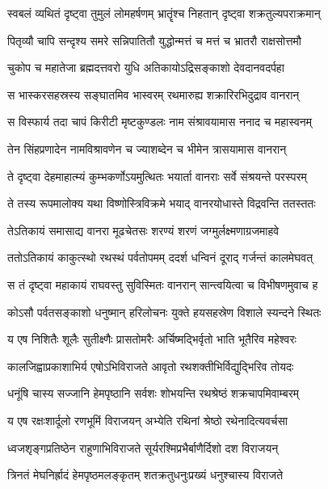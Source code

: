 
\twolineshloka
{स्वबलं व्यथितं दृष्ट्वा तुमुलं लोमहर्षणम्}
{भ्रातॄंश्च निहतान् दृष्ट्वा शक्रतुल्यपराक्रमान्} %

\twolineshloka
{पितृव्यौ चापि सन्दृश्य समरे सन्निपातितौ}
{युद्धोन्मत्तं च मत्तं च भ्रातरौ राक्षसोत्तमौ} %

\twolineshloka
{चुकोप च महातेजा ब्रह्मदत्तवरो युधि}
{अतिकायोऽद्रिसङ्काशो देवदानवदर्पहा} %

\twolineshloka
{स भास्करसहस्रस्य सङ्घातमिव भास्वरम्}
{रथमारुह्य शक्रारिरभिदुद्राव वानरान्} %

\twolineshloka
{स विस्फार्य तदा चापं किरीटी मृष्टकुण्डलः}
{नाम संश्रावयामास ननाद च महास्वनम्} %

\twolineshloka
{तेन सिंहप्रणादेन नामविश्रावणेन च}
{ज्याशब्देन च भीमेन त्रासयामास वानरान्} %

\twolineshloka
{ते दृष्ट्वा देहमाहात्म्यं कुम्भकर्णोऽयमुत्थितः}
{भयार्ता वानराः सर्वे संश्रयन्ते परस्परम्} %

\twolineshloka
{ते तस्य रूपमालोक्य यथा विष्णोस्त्रिविक्रमे}
{भयाद् वानरयोधास्ते विद्रवन्ति ततस्ततः} %

\twolineshloka
{तेऽतिकायं समासाद्य वानरा मूढचेतसः}
{शरण्यं शरणं जग्मुर्लक्ष्मणाग्रजमाहवे} %

\twolineshloka
{ततोऽतिकायं काकुत्स्थो रथस्थं पर्वतोपमम्}
{ददर्श धन्विनं दूराद् गर्जन्तं कालमेघवत्} %

\twolineshloka
{स तं दृष्ट्वा महाकायं राघवस्तु सुविस्मितः}
{वानरान् सान्त्वयित्वा च विभीषणमुवाच ह} %

\twolineshloka
{कोऽसौ पर्वतसङ्काशो धनुष्मान् हरिलोचनः}
{युक्ते हयसहस्रेण विशाले स्यन्दने स्थितः} %

\twolineshloka
{य एष निशितैः शूलैः सुतीक्ष्णैः प्रासतोमरैः}
{अर्चिष्मद्भिर्वृतो भाति भूतैरिव महेश्वरः} %

\twolineshloka
{कालजिह्वाप्रकाशाभिर्य एषोऽभिविराजते}
{आवृतो रथशक्तीभिर्विद्युद्भिरिव तोयदः} %

\twolineshloka
{धनूंषि चास्य सज्जानि हेमपृष्ठानि सर्वशः}
{शोभयन्ति रथश्रेष्ठं शक्रचापमिवाम्बरम्} %

\twolineshloka
{य एष रक्षःशार्दूलो रणभूमिं विराजयन्}
{अभ्येति रथिनां श्रेष्ठो रथेनादित्यवर्चसा} %

\twolineshloka
{ध्वजशृङ्गप्रतिष्ठेन राहुणाभिविराजते}
{सूर्यरश्मिप्रभैर्बाणैर्दिशो दश विराजयन्} %

\twolineshloka
{त्रिनतं मेघनिर्ह्रादं हेमपृष्ठमलङ्कृतम्}
{शतक्रतुधनुःप्रख्यं धनुश्चास्य विराजते} %

